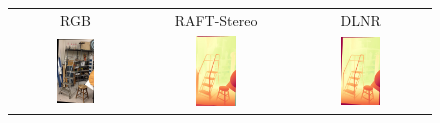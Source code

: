 \documentclass[10pt,twocolumn,letterpaper]{article}
\begin{document}
\clearpage

\begin{figure}[h]
    \centering
    \renewcommand{\tabcolsep}{1pt}
    \begin{tabular}{ccc}
        \small RGB &
        \small RAFT-Stereo \cite{lipson2021raft} &
        \small DLNR \cite{zhao2023high} \\
        \includegraphics[width=0.3\textwidth]{imgs/midd21/rgb/11.jpg} &
        \includegraphics[width=0.3\textwidth]{imgs/midd21/stereo/RAFT-Stereo/11.jpg} &
        \includegraphics[width=0.3\textwidth]{imgs/midd21/stereo/DLNR/11.jpg} \\

\end{tabular}
\end{figure}
\end{document}
